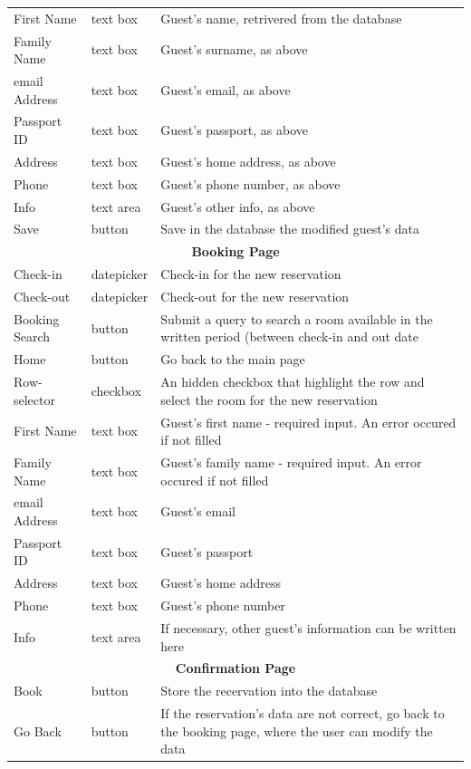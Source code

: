 \begin{center}
\begin{longtable}{| l | l | p{7cm} |}
	First Name		& text box		& Guest's name, retrivered from the database \\
	Family Name		& text box		& Guest's surname, as above \\
	email Address	& text box		& Guest's email, as above \\
	Passport ID		& text box		& Guest's passport, as above \\
	Address			& text box		& Guest's home address, as above \\
	Phone			& text box		& Guest's phone number, as above \\
	Info			& text area		& Guest's other info, as above \\
	Save			& button		& Save in the database the modified guest's data \\
	\hline \hline
	\multicolumn{3}{|c|}{\textbf{Booking Page}} \\ 
	\hline \hline
	Check-in		& datepicker	& Check-in for the new reservation \\
	Check-out		& datepicker	& Check-out for the new reservation \\
	Booking Search	& button		& Submit a query to search a room available in the written period (between check-in and out date \\
	Home			& button		& Go back to the main page \\
	\hline
	Row-selector	& checkbox		& An hidden checkbox that highlight the row and select the room for the new reservation \\
	First Name		& text box 		& Guest's first name - required input. An error occured if not filled \\
	Family Name		& text box 		& Guest's family name - required input. An error occured if not filled \\
	email Address	& text box		& Guest's email \\
	Passport ID		& text box		& Guest's passport \\
	Address			& text box		& Guest's home address \\
	Phone			& text box		& Guest's phone number \\
	Info			& text area		& If necessary, other guest's information can be written here \\
	\hline \hline
	\multicolumn{3}{|c|}{\textbf{Confirmation Page}} \\
	\hline \hline
	Book			& button		& Store the recervation into the database \\
	Go Back			& button		& If the reservation's data are not correct, go back to the booking page, where the user can modify the data \\

\end{longtable}
\end{center}
